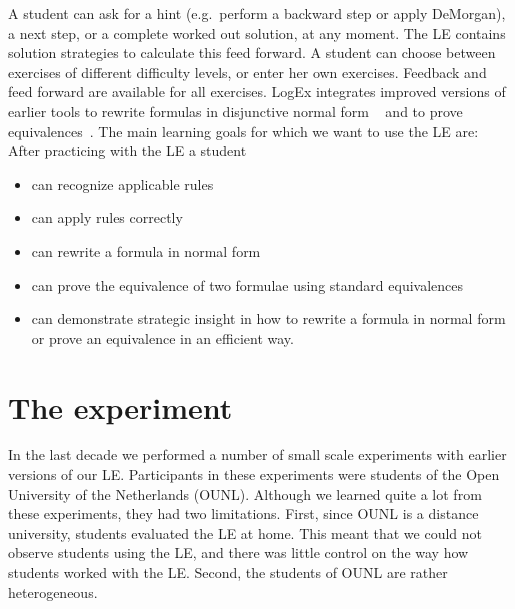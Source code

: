 \documentclass[a4paper,UKenglish]{lipics}
\begin{document}
A student can ask for a hint (e.g.~perform a backward step or apply DeMorgan), a
next step, or a complete worked out solution, at any moment. The LE contains
solution strategies to calculate this feed forward. A student can choose between
exercises of different difficulty levels, or enter her own exercises. Feedback
and feed forward are available for all exercises. LogEx integrates improved
versions of earlier tools to rewrite formulas in disjunctive normal form
~\cite{lodder,LodderUsingIdeas} and to prove
equivalences~\cite{provingequivalences}. The main learning goals for which we want to use the LE are: After practicing with the LE a student
\begin{itemize} 
\item can recognize applicable rules 
\item can apply rules correctly 
\item can rewrite a formula in normal form 
\item can prove the equivalence of two formulae using standard equivalences
\item can demonstrate strategic insight in how to rewrite a formula in normal
form or prove an equivalence in an efficient way.
\end{itemize}

\section{The experiment}
\label{sec:experiment}
In the last decade we performed a number of small scale experiments with earlier
versions of our LE. Participants in these experiments were students of the Open
University of the Netherlands (OUNL). Although we learned quite a lot from these experiments,
they had two limitations. First, since OUNL is a distance
university, students evaluated the LE at home. This meant that we could not
observe students using the LE, and there was little control on the way how
students worked with the LE. Second, the students of OUNL are
rather heterogeneous. 
\end{document}
